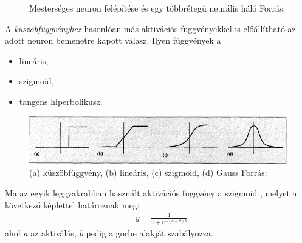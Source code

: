 \documentclass[12pt,a4]{article}
\begin{document}
	
	\begin{figure}[h]%
		\centering
		\qquad
		\caption{Mesterséges neuron felépítése és egy többrétegű neurális háló \newline\centering Forrás: \cite{ann}}%
		\label{fig:fig2}%
	\end{figure}
	\newpage
	A \textit{küszöbfüggvényhez} hasonlóan más aktivációs függvényekkel is előállítható az adott neuron bemenetre kapott válasz. Ilyen függvények a 
	\begin{itemize}
		\item lineáris,
		\item szigmoid,
		\item tangens hiperbolikusz.
	\end{itemize}

	\begin{figure}[h]	
		\centering
		\includegraphics[width=1\linewidth]{fuggvenyek}
		\caption{(a) küszöbfüggvény, (b) lineáris, (c) szigmoid, (d) Gauss 
			\newline\centering Forrás:\cite{ann2}}
		\label{fuggvenyek}
	\end{figure}
	
	\begin{mdframed}
	Ma az egyik leggyakrabban használt aktivációs függvény a szigmoid \cite{ann4}, melyet a következő képlettel határoznak meg:
	\begin{align}
		&y = \frac{1}{1 + e^{-(a - \theta)b}}
	\end{align}
	ahol \textit{a} az aktiválás, \textit{b} pedig a görbe alakját szabályozza.
	\end{mdframed}
	
\end{document}
